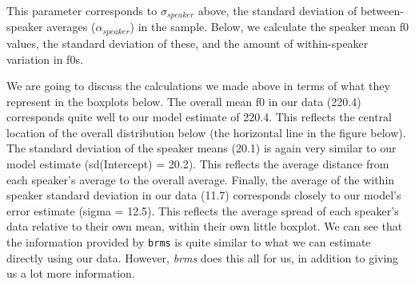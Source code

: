 \documentclass[
]{book}
\newenvironment{Shaded}{\begin{snugshade}}{\end{snugshade}}
\newcommand{\AttributeTok}[1]{\textcolor[rgb]{0.77,0.63,0.00}{#1}}
\newcommand{\CommentTok}[1]{\textcolor[rgb]{0.56,0.35,0.01}{\textit{#1}}}
\newcommand{\DocumentationTok}[1]{\textcolor[rgb]{0.56,0.35,0.01}{\textbf{\textit{#1}}}}
\newcommand{\FunctionTok}[1]{\textcolor[rgb]{0.00,0.00,0.00}{#1}}
\newcommand{\NormalTok}[1]{#1}
\newcommand{\OtherTok}[1]{\textcolor[rgb]{0.56,0.35,0.01}{#1}}
\newcommand{\SpecialCharTok}[1]{\textcolor[rgb]{0.00,0.00,0.00}{#1}}
\begin{document}
This parameter corresponds to \(\sigma_{speaker}\) above, the standard deviation of between-speaker averages (\(\alpha_{speaker}\)) in the sample. Below, we calculate the speaker mean f0 values, the standard deviation of these, and the amount of within-speaker variation in f0s.

\begin{Shaded}
\end{Shaded}

We are going to discuss the calculations we made above in terms of what they represent in the boxplots below. The overall mean f0 in our data (220.4) corresponds quite well to our model estimate of 220.4. This reflects the central location of the overall distribution below (the horizontal line in the figure below). The standard deviation of the speaker means (20.1) is again very similar to our model estimate (sd(Intercept) = 20.2). This reflects the average distance from each speaker's average to the overall average. Finally, the average of the within speaker standard deviation in our data (11.7) corresponds closely to our model's error estimate (sigma = 12.5). This reflects the average spread of each speaker's data relative to their own mean, within their own little boxplot. We can see that the information provided by \texttt{brms} is quite similar to what we can estimate directly using our data. However, \emph{brms} does this all for us, in addition to giving us a lot more information.
\end{document}
